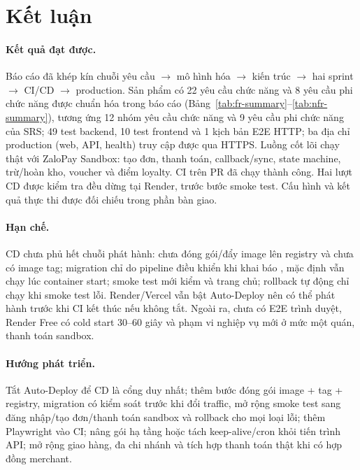 \section{Kết luận}

\paragraph{Kết quả đạt được.}
Báo cáo đã khép kín chuỗi yêu cầu $\rightarrow$ mô hình hóa $\rightarrow$ kiến trúc $\rightarrow$
hai sprint $\rightarrow$ CI/CD $\rightarrow$ production. Sản phẩm có 22 yêu cầu chức năng và 8 yêu
cầu phi chức năng được chuẩn hóa trong báo cáo (Bảng~\ref{tab:fr-summary}--\ref{tab:nfr-summary}),
tương ứng 12 nhóm yêu cầu chức năng và 9 yêu cầu phi chức năng của SRS; 49 test backend, 10 test
frontend và 1 kịch bản E2E HTTP; ba địa
chỉ production (web, API, health) truy cập được qua HTTPS. Luồng cốt lõi chạy thật với ZaloPay
Sandbox: tạo đơn, thanh toán, callback/sync, state machine, trừ/hoàn kho, voucher và điểm loyalty.
CI trên PR đã chạy thành công. Hai lượt CD được kiểm tra đều dừng tại Render,
trước bước smoke test. Cấu hình và kết quả thực thi được đối chiếu trong phần bàn giao.

\paragraph{Hạn chế.}
CD chưa phủ hết chuỗi phát hành: chưa đóng gói/đẩy image lên registry và chưa có image tag;
migration chỉ do pipeline điều khiển khi khai báo , mặc định vẫn chạy lúc
container start; smoke test mới kiểm  và trang chủ; rollback tự động chỉ chạy khi
smoke test lỗi. Render/Vercel vẫn bật Auto-Deploy nên có thể phát hành trước khi CI kết thúc nếu
không tắt. Ngoài ra, chưa có E2E trình duyệt, Render Free có cold start 30--60 giây và phạm vi
nghiệp vụ mới ở mức một quán, thanh toán sandbox.

\paragraph{Hướng phát triển.}
Tắt Auto-Deploy để CD là cổng duy nhất; thêm bước đóng gói image + tag + registry, migration có
kiểm soát trước khi đổi traffic, mở rộng smoke test sang đăng nhập/tạo đơn/thanh toán sandbox và
rollback cho mọi loại lỗi; thêm Playwright vào CI; nâng gói hạ tầng hoặc tách keep-alive/cron khỏi
tiến trình API; mở rộng giao hàng, đa chi nhánh và tích hợp thanh toán thật khi có hợp đồng
merchant.
